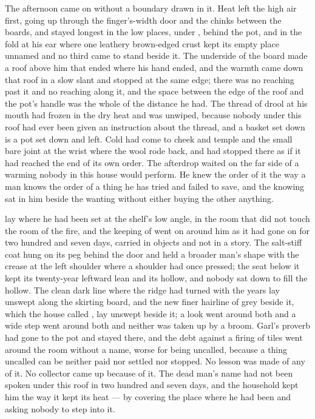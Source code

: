 The afternoon came on without a boundary drawn in it. Heat left the high air first, going up through the finger's-width door and the chinks between the boards, and stayed longest in the low places, under , behind the pot, and in the fold at his ear where one leathery brown-edged crust kept its empty place unnamed and no third came to stand beside it. The underside of the board made a roof above him that ended where his hand ended, and the warmth came down that roof in a slow slant and stopped at the same edge; there was no reaching past it and no reaching along it, and the space between the edge of the roof and the pot's handle was the whole of the distance he had. The thread of drool at his mouth had frozen in the dry heat and was unwiped, because nobody under this roof had ever been given an instruction about the thread, and a basket set down is a pot set down and left. Cold had come to cheek and temple and the small bare joint at the wrist where the wool rode back, and had stopped there as if it had reached the end of its own order. The afterdrop waited on the far side of a warming nobody in this house would perform. He knew the order of it the way a man knows the order of a thing he has tried and failed to save, and the knowing sat in him beside the wanting without either buying the other anything.

 lay where he had been set at the shelf's low angle, in the room that did not touch the room of the fire, and the keeping of  went on around him as it had gone on for two hundred and seven days, carried in objects and not in a story. The salt-stiff coat hung on its peg behind the door and held a broader man's shape with the crease at the left shoulder where a shoulder had once pressed; the seat below it kept its twenty-year leftward lean and its hollow, and nobody sat down to fill the hollow. The clean dark line where the ridge had turned with the years lay unswept along the skirting board, and the new finer hairline of grey beside it, which the house called , lay unswept beside it; a look went around both and a wide step went around both and neither was taken up by a broom. Garl's proverb had gone to the pot and stayed there, and the debt against a firing of tiles went around the room without a name, worse for being uncalled, because a thing uncalled can be neither paid nor settled nor stopped. No lesson was made of any of it. No collector came up  because of it. The dead man's name had not been spoken under this roof in two hundred and seven days, and the household kept him the way it kept its heat --- by covering the place where he had been and asking nobody to step into it.

